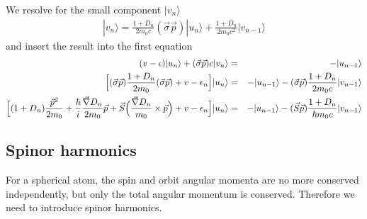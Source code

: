 \documentclass[11pt,a4paper]{report}
\begin{document}
We resolve for the small component $|v_n\rangle$
\begin{eqnarray}
|v_n\rangle=\frac{1+D_n}{2m_0c}(\vec{\sigma}\vec{p})|u_n\rangle
+\frac{1+D_n}{2m_0c^2}|v_{n-1}\rangle
\label{eq:nodelessdiracsmall}
\end{eqnarray}
and insert the result into the first equation
\begin{eqnarray}
(v-\epsilon)|u_n\rangle
+(\vec{\sigma}\vec{p})c|v_n\rangle&=&-|u_{n-1}\rangle 
\nonumber\\
\Bigl[(\vec{\sigma}\vec{p})
\frac{1+D_n}{2m_0}(\vec{\sigma}\vec{p})
+v-\epsilon_n\Bigr]|u_n\rangle
&=&-|u_{n-1}\rangle -(\vec{\sigma}\vec{p})\frac{1+D_n}{2m_0c}|v_{n-1}\rangle
\nonumber\\
\Bigl[
(1+D_n)\frac{\vec{p}^2}{2m_0}
+\frac{\hbar}{i}
\frac{\vec{\nabla}D_n}{2m_0}\vec{p}
+\vec{S}\Bigl(\frac{\vec{\nabla}D_n}{m_0}\times\vec{p}\Bigr)
+v-\epsilon_n\Bigr]|u_n\rangle
&=&-|u_{n-1}\rangle -(\vec{S}\vec{p})\frac{1+D_n}{\hbar m_0c}|v_{n-1}\rangle
\nonumber\\
\label{eq:nodelessdirac1}
\end{eqnarray}


\subsection{Spinor harmonics}
For a spherical atom, the spin and orbit angular momenta are no more
conserved independently, but only the total angular momentum is
conserved. Therefore we need to introduce spinor harmonics.
\end{document}
